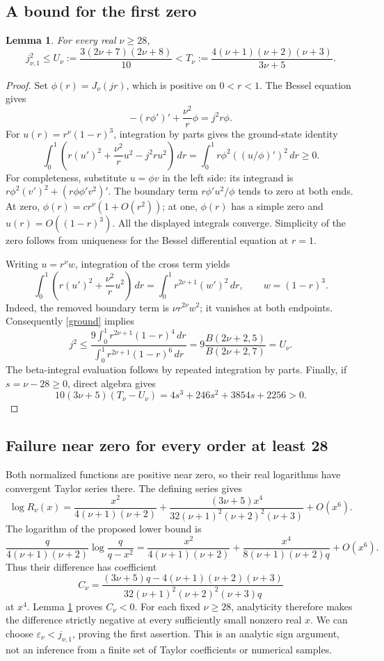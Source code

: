 \documentclass[11pt]{article}
\newtheorem{lemma}{Lemma}
\begin{document}
\subsection*{A bound for the first zero}
\begin{lemma}\label{zero}
For every real \(\nu\ge28\),
\[
 j_{\nu,1}^2\le U_\nu:=\frac{3(2\nu+7)(2\nu+8)}{10}
 <T_\nu:=\frac{4(\nu+1)(\nu+2)(\nu+3)}{3\nu+5}.
\]
\end{lemma}
\begin{proof}
Set \(\phi(r)=J_\nu(jr)\), which is positive on \(0<r<1\).
The Bessel equation gives
\[
 -(r\phi')'+\frac{\nu^2}{r}\phi=j^2r\phi .
\]
For \(u(r)=r^\nu(1-r)^3\), integration by parts gives the
ground-state identity
\begin{equation}\label{ground}
 \int_0^1\left(r(u')^2+\frac{\nu^2}{r}u^2-j^2ru^2\right)\,dr
 =\int_0^1r\phi^2\left((u/\phi)'\right)^2\,dr\ge0.
\end{equation}
For completeness, substitute \(u=\phi v\) in the left side:
its integrand is \(r\phi^2(v')^2+(r\phi\phi'v^2)'\).
The boundary term \(r\phi'u^2/\phi\) tends to zero at both ends.
At zero, \(\phi(r)=c r^\nu(1+O(r^2))\); at one,
\(\phi(r)\) has a simple zero and \(u(r)=O((1-r)^3)\).
All the displayed integrals converge. Simplicity of the zero follows
from uniqueness for the Bessel differential equation at \(r=1\).

Writing \(u=r^\nu w\), integration of the cross term yields
\[
 \int_0^1\left(r(u')^2+\frac{\nu^2}{r}u^2\right)\,dr
 =\int_0^1r^{2\nu+1}(w')^2\,dr,
 \qquad w=(1-r)^3.
\]
Indeed, the removed boundary term is \(\nu r^{2\nu}w^2\);
it vanishes at both endpoints. Consequently \eqref{ground} implies
\[
 j^2\le
 \frac{9\int_0^1r^{2\nu+1}(1-r)^4\,dr}
      {\int_0^1r^{2\nu+1}(1-r)^6\,dr}
 =9\frac{B(2\nu+2,5)}{B(2\nu+2,7)}
 =U_\nu.
\]
The beta-integral evaluation follows by repeated integration by parts.
Finally, if \(s=\nu-28\ge0\), direct algebra gives
\[
 10(3\nu+5)(T_\nu-U_\nu)
 =4s^3+246s^2+3854s+2256>0.
\]
\end{proof}

\subsection*{Failure near zero for every order at least 28}
Both normalized functions are positive near zero, so their real
logarithms have convergent Taylor series there. The defining series gives
\[
 \log R_\nu(x)=
 \frac{x^2}{4(\nu+1)(\nu+2)}
 +\frac{(3\nu+5)x^4}
 {32(\nu+1)^2(\nu+2)^2(\nu+3)}+O(x^6).
\]
The logarithm of the proposed lower bound is
\[
 \frac{q}{4(\nu+1)(\nu+2)}
       \log\frac{q}{q-x^2}
 =\frac{x^2}{4(\nu+1)(\nu+2)}
  +\frac{x^4}{8(\nu+1)(\nu+2)q}+O(x^6).
\]
Thus their difference has coefficient
\[
 C_\nu=
 \frac{(3\nu+5)q-4(\nu+1)(\nu+2)(\nu+3)}
 {32(\nu+1)^2(\nu+2)^2(\nu+3)q}
\]
at \(x^4\). Lemma \ref{zero} proves \(C_\nu<0\).
For each fixed \(\nu\ge28\), analyticity therefore makes the difference
strictly negative at every sufficiently small nonzero real \(x\).
We can choose \(\varepsilon_\nu<j_{\nu,1}\), proving the first assertion.
This is an analytic sign argument, not an inference from a finite
set of Taylor coefficients or numerical samples.
\end{document}
